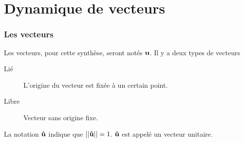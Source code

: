 

\usepackage{amsfonts}
\usepackage{amsmath}
\usepackage{amsthm}

\usepackage{tensor}
\usepackage{bm}
\usepackage[squaren, Gray]{SIunits}
\usepackage{appendix}

\newtheorem{defin}{Definition}[section]
\newtheorem{nota}[defin]{Notation}
\newtheorem{prop}[defin]{Propriete}

\newcommand\dist{\mathrm{dist}}
\newcommand\Ker{\mathrm{Ker}}
\newcommand\fv[1]{{\bf #1}} %
\newcommand\fvd[1]{\dot{\bf #1}} %
\newcommand\fvdd[1]{\ddot{\bf #1}} %
\newcommand\fvr[1]{\mathring{\bf #1}} %
\newcommand\fvrr[1]{\overset{\circ\circ}{\bf #1}} %
\newcommand\uv[1]{{\bf\hat{ #1}}} %
\newcommand\ui{{\bf\hat{I}}} %
\newcommand\uj{{\bf\hat{J}}} %
\newcommand\uk{{\bf\hat{K}}} %
\newcommand\wrt[2]{\ensuremath{\tensor*[_{ #1}]{ #2}{}}} %
\newcommand\wtr[3]{\ensuremath{\tensor*[_{ #1}]{ #2}{^{ #3}}}} %
\newcommand\omegaf{{\bm \omega}}
\newcommand\omegafr{\mathring{\bm \omega}}
\newcommand\omegafd{\dot{\bm \omega}}
\newcommand\omegaft{\tilde{\bm \omega}}
\newcommand\omegaftr{\mathring{\tilde{\bm \omega}}}
\newcommand\omegat{\tilde{\omega}}
\newcommand\omegatd{\tilde{\dot{\omega}}}
\newcommand\ine{{\bf I}}
\newcommand\st{{\bf L}}
\newcommand\pst{{\bf M}}
\newcommand\lm{{\bf N}}
\newcommand\am{{\bf H}}
\newcommand\amd{\dot{\am}}
\newcommand\fo{{\bf F}}
\newcommand\po{\mathcal{P}}
\newcommand\xg{\ensuremath{\fv{R}}}
\newcommand\xgd{\ensuremath{\fvd{R}}}
\newcommand\xgdd{\ensuremath{\fvdd{R}}}
\newcommand\dvec[1]{\dot{\vec{ #1}}}
\newcommand\ddvec[1]{\ddot{\vec{ #1}}}
\newcommand\qp{\dot{q}}
\newcommand\dqp{\Delta \dot{q}}


\part{Dynamique de vecteurs}
\section{Les vecteurs}
Les vecteurs, pour cette synthèse, seront notés $\fv{u}$.
Il y a deux types de vecteurs
\begin{description}
	\item[Lié] L'origine du vecteur est fixée à un certain point.
	\item[Libre] Vecteur sans origine fixe.
\end{description}
La notation $\uv{u}$ indique que $||\uv{u}|| = 1$.
$\uv{u}$ est appelé un vecteur unitaire.

